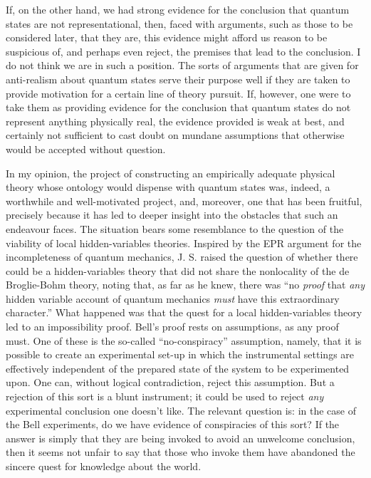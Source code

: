 \documentclass[12pt]{article}
\begin{document}
If, on the other hand, we had strong evidence for the conclusion that  quantum states are not representational, then, faced with arguments, such as those to be considered later, that they are, this evidence might afford us reason to be suspicious of, and perhaps even reject, the premises that lead to the conclusion.  I do not think we are in such  a position.  The sorts of arguments that are given for anti-realism about quantum states serve their purpose well if they are taken to provide motivation for a certain line of theory pursuit.  If, however, one were to take them as providing evidence for the conclusion that quantum states do not represent anything physically real, the evidence provided is  weak at best, and certainly not sufficient to cast doubt on mundane assumptions that otherwise would be accepted without question.

In my opinion, the project of constructing an empirically adequate physical theory whose ontology would dispense with quantum states was, indeed, a worthwhile and well-motivated project, and, moreover, one that has been fruitful, precisely because it has led to deeper insight into the obstacles that such an endeavour faces. The situation bears some resemblance to the question of the viability of local hidden-variables theories. Inspired by the EPR argument for the incompleteness of quantum mechanics, J. S. \citet{BellHV}  raised the question of whether there could be a hidden-variables theory that did not share the nonlocality of the de Broglie-Bohm theory, noting that, as far as he knew, there was ``no \emph{proof} that \emph{any} hidden variable account of quantum mechanics \emph{must} have this extraordinary character.'' What happened was that the quest for a local hidden-variables theory led to an impossibility proof.  Bell's proof rests on assumptions, as any proof must. One of these is the so-called ``no-conspiracy'' assumption, namely, that it is possible to create an experimental set-up in which the instrumental settings are effectively independent of the prepared state of the system to be experimented upon.  One can, without logical contradiction, reject this assumption.  But a rejection of this sort is a blunt instrument; it could be used to reject \emph{any} experimental conclusion one doesn't like.  The relevant question is: in the case of the Bell experiments, do we have evidence of conspiracies of this sort?  If the answer is simply that they are being invoked to avoid an unwelcome conclusion, then it seems not unfair to say that those who invoke them have abandoned the sincere quest for knowledge about the world.
\end{document}
